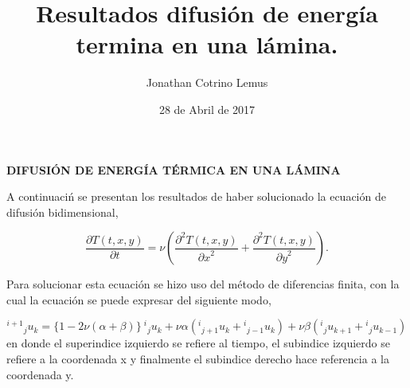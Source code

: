 \documentclass{article}
\title{Resultados difusión de energía termina en una lámina.}
\author{Jonathan Cotrino Lemus}
\date{28 de Abril de 2017}
\begin{document}
\begin{center}
\textbf{DIFUSI\'ON DE ENERG\'IA T\'ERMICA EN UNA L\'AMINA}
\end{center}
A continuaci\'n se presentan los resultados de haber solucionado la ecuaci\'on de difusi\'on bidimensional,

\begin{equation}
\frac{\partial{T(t, x, y)}}{\partial{t}} = \nu \left(  \frac{{\partial}^2 T(t, x, y)}{{\partial x}^2} + \frac{{\partial}^2 T(t, x, y)}{{\partial y}^2} \right).
\end{equation}

Para solucionar esta ecuaci\'on se hizo uso del m\'etodo de diferencias finita, con la cual la ecuaci\'on se puede expresar del siguiente modo,

\begin{equation}
{^{i+1}}{_j}u_k = \{ 1 - 2 \nu (\alpha + \beta)\} \ {^i}{_j} u_{k} + \nu \alpha ({^i}{_{j+1}} u_{k} + {^i}{_{j-1}} u_{k}) + \nu \beta ({^i}{_j} u_{k+1} + {^i}{_j} u_{k-1})
\end{equation}
 en donde el superindice izquierdo se refiere al tiempo, el subindice izquierdo se refiere a la coordenada x y finalmente el subindice derecho hace referencia a la coordenada y.
\end{document}
